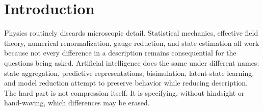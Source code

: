 \documentclass[11pt]{article}
\begin{document}
\section{Introduction}

Physics routinely discards microscopic detail. Statistical mechanics, effective field theory, numerical renormalization, gauge reduction, and state estimation all work because not every difference in a description remains consequential for the questions being asked. Artificial intelligence does the same under different names: state aggregation, predictive representations, bisimulation, latent-state learning, and model reduction attempt to preserve behavior while reducing description. The hard part is not compression itself. It is specifying, without hindsight or hand-waving, which differences may be erased.
\end{document}
